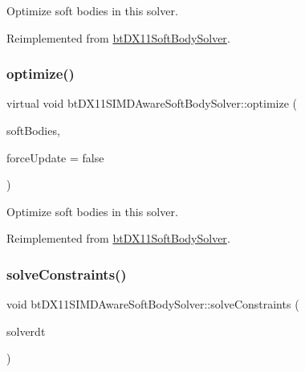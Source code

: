 Optimize soft bodies in this solver. 

Reimplemented from \hyperlink{classbtDX11SoftBodySolver_a1d181b7e59619553241ac463db54c490}{bt\+D\+X11\+Soft\+Body\+Solver}.

\mbox{\label{classbtDX11SIMDAwareSoftBodySolver_a438ad9c2749189a20c5c950023893f76}} 
\subsubsection{\texorpdfstring{optimize()}{optimize()}\hspace{0.1cm}{\footnotesize\ttfamily [2/2]}}
{\footnotesize\ttfamily virtual void bt\+D\+X11\+S\+I\+M\+D\+Aware\+Soft\+Body\+Solver\+::optimize (\begin{DoxyParamCaption}\item[{\hyperlink{classbtAlignedObjectArray}{bt\+Aligned\+Object\+Array}$<$ \hyperlink{classbtSoftBody}{bt\+Soft\+Body} $\ast$ $>$ \&}]{soft\+Bodies,  }\item[{bool}]{force\+Update = {\ttfamily false} }\end{DoxyParamCaption})\hspace{0.3cm}{\ttfamily [virtual]}}

Optimize soft bodies in this solver. 

Reimplemented from \hyperlink{classbtDX11SoftBodySolver_a1d181b7e59619553241ac463db54c490}{bt\+D\+X11\+Soft\+Body\+Solver}.

\mbox{\label{classbtDX11SIMDAwareSoftBodySolver_ae78972e067e72a8b5cb51ad05def50df}} 
\subsubsection{\texorpdfstring{solve\+Constraints()}{solveConstraints()}\hspace{0.1cm}{\footnotesize\ttfamily [1/2]}}
{\footnotesize\ttfamily void bt\+D\+X11\+S\+I\+M\+D\+Aware\+Soft\+Body\+Solver\+::solve\+Constraints (\begin{DoxyParamCaption}\item[{float}]{solverdt }\end{DoxyParamCaption})\hspace{0.3cm}{\ttfamily [virtual]}}

